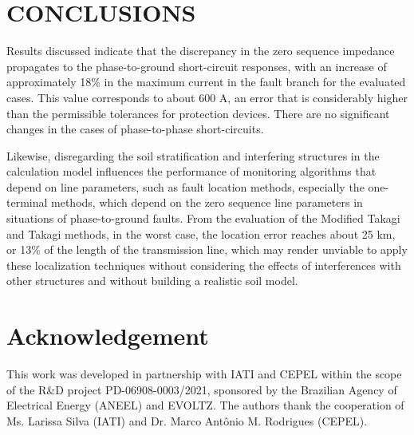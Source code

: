 \documentclass[conference]{IEEEtran}
\begin{document}
	\section{CONCLUSIONS}
	
	Results discussed indicate that the discrepancy in the zero sequence impedance propagates to the phase-to-ground short-circuit responses, with an increase of approximately 18\% in the maximum current in the fault branch for the evaluated cases. This value corresponds to about 600 A, an error that is considerably higher than the permissible tolerances for protection devices. There are no significant changes in the cases of phase-to-phase short-circuits.
	
	Likewise, disregarding the soil stratification and interfering structures in the calculation model influences the performance of monitoring algorithms that depend on line parameters, such as fault location methods, especially the one-terminal methods, which depend on the zero sequence line parameters in situations of phase-to-ground faults. From the evaluation of the Modified Takagi and Takagi methods, in the worst case, the location error reaches about 25 km, or 13\% of the length of the transmission line, which may render unviable to apply these localization techniques without considering the effects of interferences with other structures and without building a realistic soil model.
	
	\section*{Acknowledgement}
This work was developed  in partnership with IATI and CEPEL within the scope of the R\&D project PD-06908-0003/2021, sponsored by the Brazilian Agency of Electrical Energy (ANEEL) and EVOLTZ. The authors thank the cooperation of Ms. Larissa Silva (IATI) and Dr. Marco Antônio M. Rodrigues (CEPEL).
	
	
	\nocite{*}
	
	
	
\end{document}
